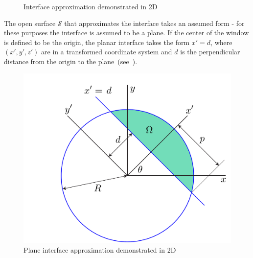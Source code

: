\begin{figure}[ht]
{\label{fig:subfigure6}}

\caption{Interface approximation demonstrated in 2D}
\label{fig:figure3}
\end{figure}

The open surface $\mathcal{S}$ that approximates the interface takes an assumed form - for these purposes the interface is assumed to be a plane. If the center of the window is defined to be the origin, the planar interface takes the form $x' = d$, where $(x',y',z')$ are in a transformed coordinate system and $d$ is the perpendicular distance from the origin to the plane~(see~).

\begin{figure}[ht!]
	\centering
		\includegraphics[scale=0.3]{media/om/window.pdf}
	\caption{Plane interface approximation demonstrated in 2D}
	\label{fig:quad}
\end{figure}

